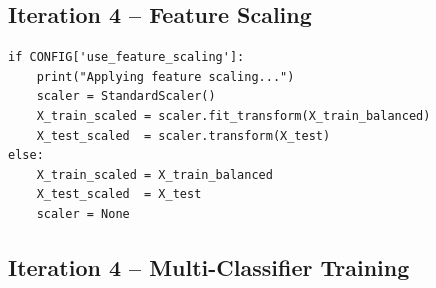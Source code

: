 \documentclass[11pt, titlepage, bibliography=totoc]{scrreprt}
\begin{document}
\subsection*{Iteration 4 -- Feature Scaling}

\begin{lstlisting}[label=lst:feature-scaling,
  caption={StandardScaler feature normalisation applied after SMOTE in Iteration~4.}]
if CONFIG['use_feature_scaling']:
    print("Applying feature scaling...")
    scaler = StandardScaler()
    X_train_scaled = scaler.fit_transform(X_train_balanced)
    X_test_scaled  = scaler.transform(X_test)
else:
    X_train_scaled = X_train_balanced
    X_test_scaled  = X_test
    scaler = None
\end{lstlisting}

\subsection*{Iteration 4 -- Multi-Classifier Training}
\end{document}
